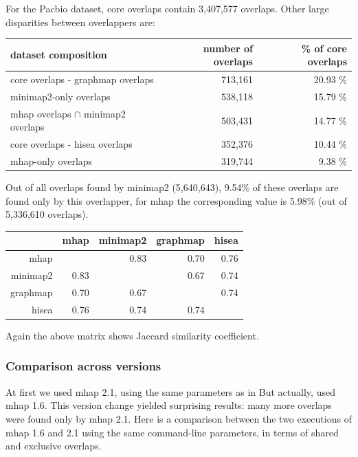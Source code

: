 \documentclass[./main.tex]{subfiles}
\begin{document}
For the Pacbio dataset, core overlaps contain 3,407,577 overlaps. Other
large disparities between overlappers are:

\begin{table}[ht]
\centering
\begin{tabular}{lrr}
\hline
dataset composition & number of overlaps & \% of core overlaps \\
\hline
core overlaps - graphmap overlaps & 713,161 & 20.93 \% \\
minimap2-only overlaps & 538,118 & 15.79 \% \\
mhap overlaps \(\cap\) minimap2 overlaps & 503,431 & 14.77 \% \\
core overlaps - hisea overlaps & 352,376 & 10.44 \% \\
mhap-only overlaps & 319,744 & 9.38 \% \\
\hline
\end{tabular}
\end{table}

Out of all overlaps found by minimap2 (5,640,643), 9.54\% of these
overlaps are found only by this overlapper, for mhap the corresponding
value is 5.98\% (out of 5,336,610 overlaps).

\begin{table}[ht]
\centering
\begin{tabular}{rrrrr}
\hline
& mhap & minimap2 & graphmap & hisea \\
\hline
mhap & & 0.83 & 0.70 & 0.76 \\
minimap2 & 0.83 & & 0.67 & 0.74 \\
graphmap & 0.70 & 0.67 & & 0.74 \\
hisea & 0.76 & 0.74 & 0.74 & \\
\hline
\end{tabular}
\end{table}

Again the above matrix shows Jaccard similarity coefficient.


\subsubsection{Comparison across versions}\label{preassembly:ovl:comparison-across-versions}

At first we used mhap 2.1, using the same parameters as in \citeauthor{ovl_bench}
But actually, \citeauthor{ovl_bench} used mhap 1.6. This version change
yielded surprising results: many more overlaps were found only by mhap
2.1. Here is a comparison between the two executions of mhap 1.6 and 2.1
using the same command-line parameters, in terms of shared and exclusive
overlaps.
\end{document}

